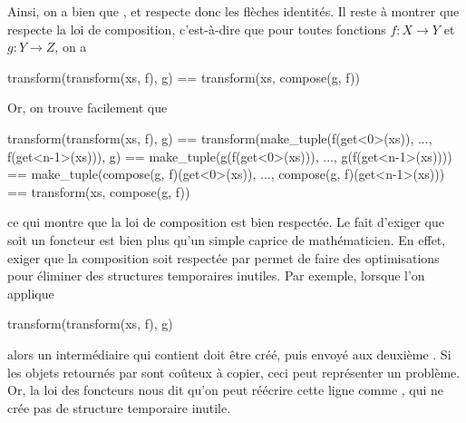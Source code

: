 Ainsi, on a bien que , et  respecte
donc les flèches identités. Il reste à montrer que  respecte la
loi de composition, c'est-à-dire que pour toutes fonctions $f : X \to Y$ et
$g : Y \to Z$, on a
\begin{cpp}
    transform(transform(xs, f), g) == transform(xs, compose(g, f))
\end{cpp}

Or, on trouve facilement que
\begin{cpp}
    transform(transform(xs, f), g)
        == transform(make_tuple(f(get<0>(xs)), ..., f(get<n-1>(xs))), g)
        == make_tuple(g(f(get<0>(xs))), ..., g(f(get<n-1>(xs))))
        == make_tuple(compose(g, f)(get<0>(xs)), ..., compose(g, f)(get<n-1>(xs)))
        == transform(xs, compose(g, f))
\end{cpp}

ce qui montre que la loi de composition est bien respectée. Le fait d'exiger
que  soit un foncteur est bien plus qu'un simple caprice de
mathématicien. En effet, exiger que la composition soit respectée par
 permet de faire des optimisations pour éliminer des
structures temporaires inutiles. Par exemple, lorsque l'on applique
\begin{cpp}
    transform(transform(xs, f), g)
\end{cpp}

alors un  intermédiaire qui contient  doit
être créé, puis envoyé aux deuxième . Si les objets retournés
par  sont coûteux à copier, ceci peut représenter un problème. Or, la
loi des foncteurs nous dit qu'on peut réécrire cette ligne comme
, qui ne crée pas de structure
temporaire inutile.



